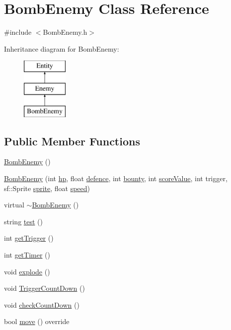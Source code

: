 \hypertarget{class_bomb_enemy}{\section{Bomb\+Enemy Class Reference}
\label{class_bomb_enemy}
}


{\ttfamily \#include $<$Bomb\+Enemy.\+h$>$}

Inheritance diagram for Bomb\+Enemy\+:\begin{figure}[H]
\begin{center}
\leavevmode
\includegraphics[height=3.000000cm]{class_bomb_enemy}
\end{center}
\end{figure}
\subsection*{Public Member Functions}
\begin{DoxyCompactItemize}
\item 
\hyperlink{class_bomb_enemy_a6b23badbfab051daf75ef8c10bfcd915}{Bomb\+Enemy} ()
\item 
\hyperlink{class_bomb_enemy_a3d5bbfa65313a43603d1a23cd66f9cd1}{Bomb\+Enemy} (int \hyperlink{class_enemy_a278d70100af07c946743db1b7a1a9f59}{hp}, float \hyperlink{class_enemy_a9bb5d74024760e604c41ba79cc7da892}{defence}, int \hyperlink{class_enemy_a1d9a86d110b87f3cc55b40d1bdb59eb5}{bounty}, int \hyperlink{class_enemy_abc49d5a2cef917c8ece8a16547f8efee}{score\+Value}, int trigger, sf\+::\+Sprite \hyperlink{class_entity_a48ef4ab143b8d0211877c9f6be42e824}{sprite}, float \hyperlink{class_entity_a1de3d8d9ab8088f61e6726069b26fa60}{speed})
\item 
virtual \hyperlink{class_bomb_enemy_a8a79819bd365d564c77058f0fd9495c4}{$\sim$\+Bomb\+Enemy} ()
\item 
string \hyperlink{class_bomb_enemy_a6fde389b791b1d977caa01a15a66df1c}{test} ()
\item 
int \hyperlink{class_bomb_enemy_a9d1db939bea4bf8a9fc4b5bfead03fc3}{get\+Trigger} ()
\item 
int \hyperlink{class_bomb_enemy_a5a8244c65fbf9f8fceb07080e11ddbe8}{get\+Timer} ()
\item 
void \hyperlink{class_bomb_enemy_a0a984610f97fe852884e0d00d0461a9c}{explode} ()
\item 
void \hyperlink{class_bomb_enemy_a7eb5ed711a40cbd0af016450bf59b0e4}{Trigger\+Count\+Down} ()
\item 
void \hyperlink{class_bomb_enemy_a15e34ebba40eaf805ffe179ec4c9a2af}{check\+Count\+Down} ()
\item 
bool \hyperlink{class_bomb_enemy_ae421414fdc87d4cb92bdc6975a3b28b4}{move} () override
\end{DoxyCompactItemize}
